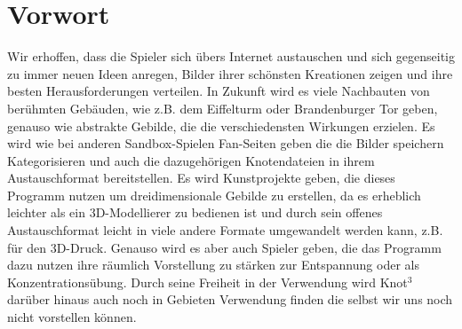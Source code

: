 
\chapter{Vorwort}
\label{EF:Vorstellungen}
Wir erhoffen, dass die Spieler sich übers Internet austauschen und sich gegenseitig zu immer neuen Ideen anregen, Bilder ihrer schönsten Kreationen zeigen und ihre besten Herausforderungen verteilen. In Zukunft wird es viele Nachbauten von berühmten Gebäuden, wie z.B. dem Eiffelturm oder Brandenburger Tor geben, genauso wie abstrakte Gebilde, die die verschiedensten Wirkungen erzielen. Es wird wie bei anderen Sandbox-Spielen Fan-Seiten geben die die Bilder speichern Kategorisieren und auch die dazugehörigen Knotendateien in ihrem Austauschformat bereitstellen. Es wird Kunstprojekte geben, die dieses Programm nutzen um dreidimensionale Gebilde zu erstellen, da es erheblich leichter als ein 3D-Modellierer zu bedienen ist und durch sein offenes Austauschformat leicht in viele andere Formate umgewandelt werden kann, z.B. für den 3D-Druck. Genauso wird es aber auch Spieler geben, die das Programm dazu nutzen ihre räumlich Vorstellung zu stärken zur Entspannung oder als Konzentrationsübung.
Durch seine Freiheit in der Verwendung wird Knot$^3$ darüber hinaus auch noch in Gebieten Verwendung finden die selbst wir uns noch nicht vorstellen können.
